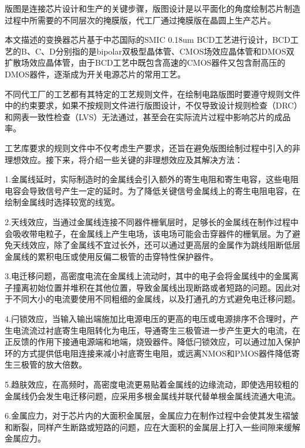 版图是连接芯片设计和生产的关键步骤，版图设计是以平面化的角度绘制芯片制造过程中所需要的不同层次的掩膜版，代工厂通过掩膜版在晶圆上生产芯片。

本文描述的变换器芯片基于中芯国际的SMIC 0.18um BCD工艺进行设计，BCD工艺的B、C、D分别指的是bipolar双极型晶体管、CMOS场效应晶体管和DMOS双扩散场效应晶体管，由于BCD工艺中既包含高速的CMOS器件又包含耐高压的DMOS器件，逐渐成为开关电源芯片的常用工艺。


不同代工厂的工艺都有其特定的工艺规则文件，在绘制电路版图时要遵守规则文件中的约束要求，如果不按规则文件进行版图设计，不仅导致设计规则检查（DRC）和网表一致性检查（LVS）无法通过，甚至会在实际流片过程中影响芯片的成品率。

工艺库要求的规则文件中不仅考虑生产要求，还旨在避免版图绘制过程中引入的非理想效应。接下来，将介绍一些关键的非理想效应及其解决方法：


1.金属线延时，实际制造时的金属线会引入额外的寄生电阻和寄生电容，这些电阻电容会导致信号产生一定的延时。为了降低关键信号金属线上的寄生电阻电容，在绘制金属线时选择较宽的线宽。

2.天线效应，当通过金属线连接不同器件栅氧层时，足够长的金属线在制作过程中会吸收带电粒子，在金属线上产生电场，该电场可能会击穿器件的栅氧层。为了避免天线效应，除了金属线不宜过长外，还可以通过更高层的金属作为跳线阻断低层金属线的累积电压或使用反偏二极管的击穿特性保护器件。

3.电迁移问题，高密度电流在金属线上流动时，其中的电子会将金属线中的金属离子撞离初始位置并堆积在其他位置，导致金属线出现断路或者短路的问题。因此对于不同大小的电流要使用不同粗细的金属线，以及打通孔的方式避免电迁移问题。

4.闩锁效应，当输入输出端施加比电源电压的更高的电压或电源排序不合理时，产生电流流过衬底寄生电阻转化为电压，导通寄生三极管进一步产生更大的电流，在正反馈的作用下接通电源端和地端，烧毁器件。降低闩锁效应，可以通过加入保护环的方式提供低电阻连接来减小衬底寄生电阻，或远离NMOS和PMOS器件降低寄生三极管的放大倍数。

5.趋肤效应，在高频时，高密度电流更易贴着金属线的边缘流动，即使选用较粗的金属线仍会发生电迁移问题，应采用多根金属线并联代替单根金属线流通大电流。

6.金属应力，对于芯片内的大面积金属层，金属应力在制作过程中会使其发生褶皱和断裂，同样产生断路或短路的问题，应在大面积的金属层上打入一些间隙来缓解金属应力。

